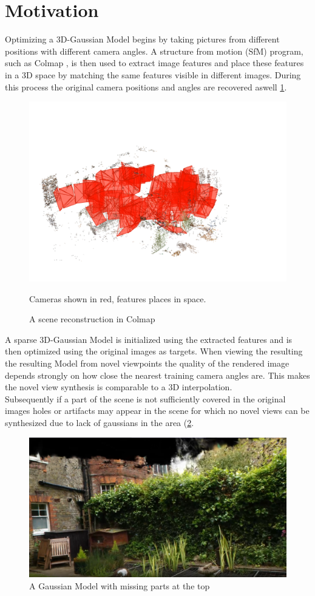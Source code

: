 \section{Motivation}
Optimizing a 3D-Gaussian Model begins by taking pictures from different positions with different camera angles. A structure from motion (SfM) program, such as Colmap \cite{schoenberger2016mvs, schoenberger2016sfm}, is then used to extract image features and place these features in a 3D space by matching the same features visible in different images. During this process the original camera positions and angles are recovered aswell \ref{fig:colmap}.\\
\begin{figure}[h]
\centering %
\includegraphics[width=0.6\linewidth]{Images/Chapter/colmap.pdf} %
\caption{A scene reconstruction in Colmap}\label{fig:colmap}
Cameras shown in red, features places in space.
\end{figure}
A sparse 3D-Gaussian Model is initialized using the extracted features and is then optimized using the original images as targets.
When viewing the resulting the resulting Model from novel viewpoints the quality of the rendered image depends strongly on how close the nearest training camera angles are. This makes the novel view synthesis is comparable to a 3D interpolation.\cite{kerbl3Dgaussians}\\
Subsequently if a part of the scene is not sufficiently covered in the original images holes or artifacts may appear in the scene for which no novel views can be synthesized due to lack of gaussians in the area (\ref{fig:hole}.\\
\begin{figure}[b]
\centering %
\includegraphics[width=0.6\linewidth]{Images/Chapter/hole.pdf} %
\caption{A Gaussian Model with missing parts at the top}\label{fig:hole}
\end{figure}
